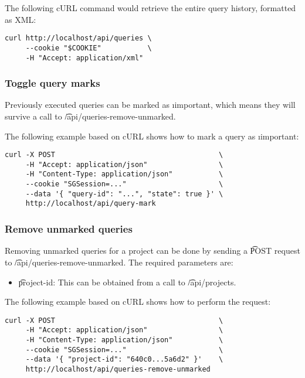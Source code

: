   The following cURL command would retrieve the entire query history, formatted
  as XML:

\begin{siderules}
\begin{verbatim}
curl http://localhost/api/queries \
     --cookie "$COOKIE"           \
     -H "Accept: application/xml"
\end{verbatim}
\end{siderules}

\subsubsection{Toggle query marks}

\begin{sloppypar}
  Previously executed queries can be marked as \i{important}, which means
  they will survive a call to \t{/api/queries-remove-unmarked}.
\end{sloppypar}

  The following example based on cURL shows how to mark a query as
  \i{important}:
\begin{siderules}
\begin{verbatim}
curl -X POST                                       \
     -H "Accept: application/json"                 \
     -H "Content-Type: application/json"           \
     --cookie "SGSession=..."                      \
     --data '{ "query-id": "...", "state": true }' \
     http://localhost/api/query-mark
\end{verbatim}
\end{siderules}

\subsubsection{Remove unmarked queries}

  Removing unmarked queries for a project can be done by sending a
  \t{POST} request to \t{/api/queries-remove-unmarked}.
  The required parameters are:

  \begin{itemize}
    \item{\t{project-id}: This can be obtained from a call to
      \t{/api/projects}.}
  \end{itemize}

  The following example based on cURL shows how to perform the request:
\begin{siderules}
\begin{verbatim}
curl -X POST                                       \
     -H "Accept: application/json"                 \
     -H "Content-Type: application/json"           \
     --cookie "SGSession=..."                      \
     --data '{ "project-id": "640c0...5a6d2" }'    \
     http://localhost/api/queries-remove-unmarked
\end{verbatim}
\end{siderules}
